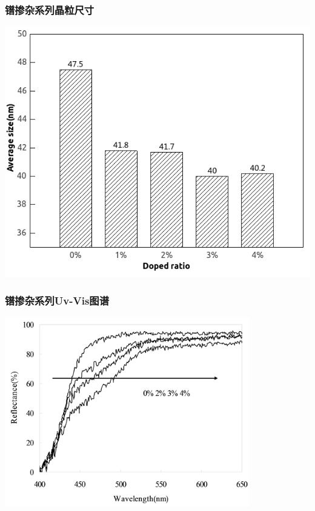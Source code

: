 \documentclass[xetex,compress]{mybeamer}
\begin{document}
\begin{frame}
\frametitle{镨掺杂系列晶粒尺寸}
\begin{block}{}
\centering
\includegraphics[scale=6]{figures/镨掺杂粒径大小.jpg} 
\end{block}
\end{frame}


\begin{frame}
\frametitle{镨掺杂系列Uv-Vis图谱}
\begin{block}{}
\centering
\includegraphics[width=0.8\textwidth]{figures/镨掺杂UV.jpg} 
\end{block}
\end{frame}
\end{document}
